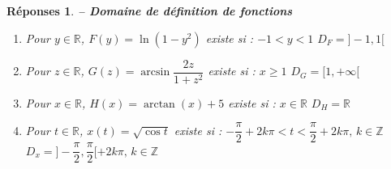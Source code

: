 \documentclass[a4paper,11pt]{article}
\newenvironment{alphate}{\begin{enumerate}[label=\alph*)]}{\end{enumerate}}
\newtheorem{rep}{R\'eponses}
\newenvironment{reponse}{\begin{rep} \em}{\end{rep}}
\begin{document}
\begin{reponse} {\bf -- Domaine de d\'efinition de fonctions}
\begin{alphate}
\item Pour $ y \in \mathbb{R}$, $F(y)=\ln(1-y^2)$ existe si :
    $ -1 < y < 1 $  \hspace{1cm}
    $\boxed{D_F = ]-1,1[}$
\item Pour $ z \in \mathbb{R}$, $G(z)=\arcsin \dfrac{2z}{1+z^2}$ existe si :
    $x \geq 1 $  \hspace{1cm}
    $\boxed{D_G =[1,+\infty[}$
\item Pour $ x \in \mathbb{R}$,  $H(x)=\arctan(x)+5$ existe si :
    $x \in \mathbb{R} $  \hspace{1cm}
    $\boxed{D_H = \mathbb{R}}$
\item Pour $ t \in \mathbb{R}$, $x(t)=\sqrt{\cos t}$ existe si :
    $ -\dfrac{\pi}{2} + 2k\pi < t < \dfrac{\pi}{2} + 2k\pi, \, k\in \mathbb{Z}  $  \hspace{1cm}
    $\boxed{D_x =]-\dfrac{\pi}{2},\dfrac{\pi}{2} [ + 2k \pi, \, k\in \mathbb{Z}}$

    
\end{alphate}
\end{reponse}


\end{document}
